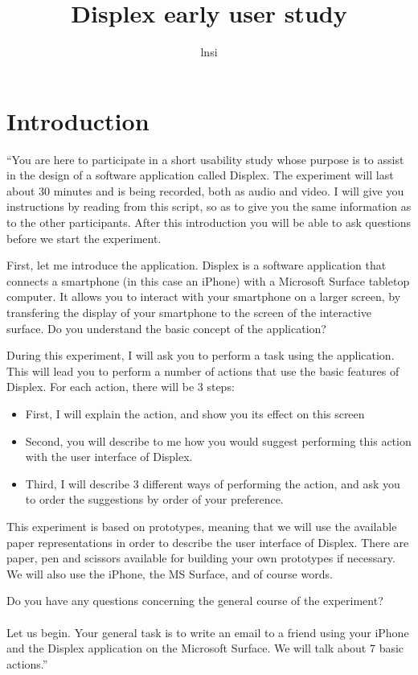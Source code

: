 \documentclass[11pt]{amsart}
\title{Displex early user study}
\author{lnsi}
\begin{document}
\maketitle

\section{Introduction}
``You are here to participate in a short usability study whose purpose is to assist in the design of a software application called Displex.
The experiment will last about 30 minutes and is being recorded, both as audio and video.
I will give you instructions by reading from this script, so as to give you the same information as to the other participants.
After this introduction you will be able to ask questions before we start the experiment.

First, let me introduce the application.
Displex is a software application that connects a smartphone (in this case an iPhone) with a Microsoft Surface tabletop computer.
It allows you to interact with your smartphone on a larger screen, by transfering the display of your smartphone to the screen of the interactive surface.
Do you understand the basic concept of the application?

During this experiment, I will ask you to perform a task using the application.
This will lead you to perform a number of actions that use the basic features of Displex.
For each action, there will be 3 steps:

\begin{itemize}
\item{First, I will explain the action, and show you its effect on this screen}
\item{Second, you will describe to me how you would suggest performing this action with the user interface of Displex.}
\item{Third, I will describe 3 different ways of performing the action, and ask you to order the suggestions by order of your preference.}
\end{itemize}

This experiment is based on prototypes, meaning that we will use the available paper representations in order to describe the user interface of Displex.
There are paper, pen and scissors available for building your own prototypes if necessary.
We will also use the iPhone, the MS Surface, and of course words.

Do you have any questions concerning the general course of the experiment?
\\\\
Let us begin.
Your general task is to write an email to a friend using your iPhone and the Displex application on the Microsoft Surface.
We will talk about 7 basic actions.''

\pagebreak
\end{document}
